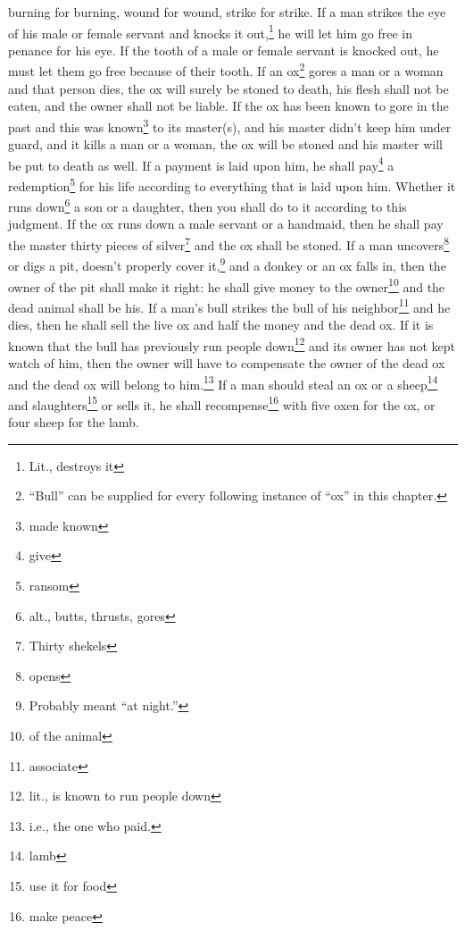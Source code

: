 \begin{enumerate}[align=center]
     burning for burning, wound for wound, strike for strike.%
     If a man strikes the eye of his male or female servant and knocks it out,\footnote{Lit., destroys it} he will let him go free in penance for his eye.%
     If the tooth of a male or female servant is knocked out, he must let them go free because of their tooth.%
     If an ox\footnote{``Bull'' can be supplied for every following instance of ``ox'' in this chapter.} gores a man or a woman and that person dies, the ox will surely be stoned to death, his flesh shall not be eaten, and the owner shall not be liable.%
     If the ox has been known to gore in the past and this was known\footnote{made known} to its master(s), and his master didn't keep him under guard, and it kills a man or a woman, the ox will be stoned and his master will be put to death as well.%
     If a payment is laid upon him, he shall pay\footnote{give} a redemption\footnote{ransom} for his life according to everything that is laid upon him.%
     Whether it runs down\footnote{alt., butts, thrusts, gores} a son or a daughter, then you shall do to it according to this judgment.%
     If the ox runs down a male servant or a handmaid, then he shall pay the master thirty pieces of silver\footnote{Thirty shekels} and the ox shall be stoned.%
     If a man uncovers\footnote{opens} or digs a pit, doesn't properly cover it,\footnote{Probably meant ``at night.''} and a donkey or an ox falls in,%
     then the owner of the pit shall make it right: he shall give money to the owner\footnote{of the animal} and the dead animal shall be his.%
     If a man's bull strikes the bull of his neighbor\footnote{associate} and he dies, then he shall sell the live ox and half the money and the dead ox.%
     If it is known that the bull has previously run people down\footnote{lit., is known to run people down} and its owner has not kept watch of him, then the owner will have to compensate the owner of the dead ox and the dead ox will belong to him.\footnote{i.e., the one who paid.}%
     If a man should steal an ox or a sheep\footnote{lamb} and slaughters\footnote{use it for food} or sells it, he shall recompense\footnote{make peace} with five oxen for the ox, or four sheep for the lamb.%
\end{enumerate}
